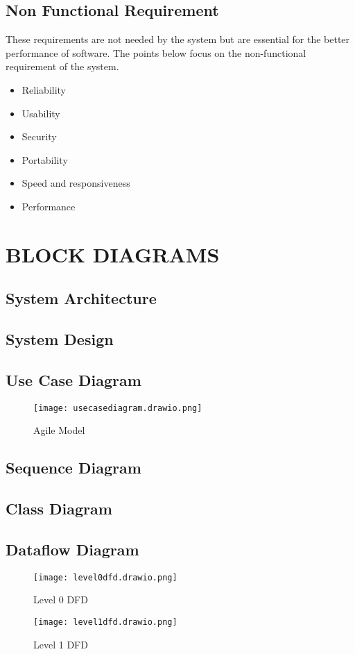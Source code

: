 \documentclass[12 pt]{article}
\begin{document}
\subsection{Non Functional Requirement}
\justify
These requirements are not needed by the system but are essential for the better
performance of software. The points below focus on the non-functional requirement of
the system.
\begin{itemize}
    \item Reliability
    \item   Usability
    \item   Security
    \item   Portability
    \item   Speed and responsiveness
    \item  Performance
\end{itemize}


\newpage

\section{BLOCK DIAGRAMS}
\subsection{System Architecture}
\newpage
\subsection{System Design}
\newpage
\subsection{Use Case Diagram}
\begin{figure}[h]
    \centering
    \texttt{[image: usecasediagram.drawio.png]}
    \caption{Agile Model}
\end{figure}
\newpage
\subsection{Sequence Diagram}
\newpage
\subsection{Class Diagram}
\newpage
\subsection{Dataflow Diagram}
\begin{figure}[h]
    \centering
    \texttt{[image: level0dfd.drawio.png]}
    \caption{Level 0 DFD}
\end{figure}\begin{figure}[h]
    \centering
    \texttt{[image: level1dfd.drawio.png]}
    \caption{Level 1 DFD}
\end{figure}
\newpage
\end{document}
